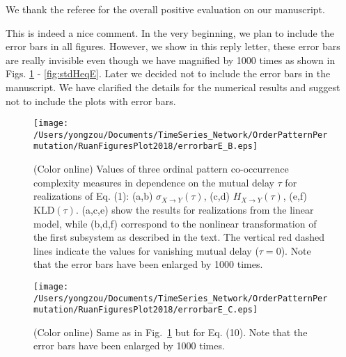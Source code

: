 \documentclass[aps,chaos,superscriptaddress,showkeys]{revtex4}
\begin{document}
\begin{center}
\begin{minipage}[c]{0.9\textwidth}
We thank the referee for the overall positive evaluation on our manuscript. 
\end{minipage}
\end{center}




\begin{center}
\begin{minipage}[c]{0.9\textwidth}
This is indeed a nice comment. In the very beginning, we plan to include the error bars in all figures. However, we show in this reply letter, these error bars are really invisible even though we have magnified by 1000 times as shown in Figs. \ref{fig:stdHeqB} - \ref{fig:stdHeqE}. Later we decided not to include the error bars in the manuscript. We have clarified the details for the numerical results and suggest not to include the plots with error bars.

\end{minipage}
\end{center}
\begin{figure}
	\centering
	\texttt{[image: /Users/yongzou/Documents/TimeSeries\_Network/OrderPatternPermutation/RuanFiguresPlot2018/errorbarE\_B.eps]}
\caption{(Color online) Values of three ordinal pattern co-occurrence complexity measures in dependence on the mutual delay $\tau$ for realizations of Eq. (1): (a,b) $\sigma_{X\to Y}(\tau)$, (c,d) $H_{X \to Y}(\tau)$, (e,f) $\text{KLD}(\tau)$. (a,c,e) show the results for realizations from the linear model, while (b,d,f) correspond to the nonlinear transformation of the first subsystem as described in the text. The vertical red dashed lines indicate the values for vanishing mutual delay ($\tau=0$). {\color{red}Note that the error bars have been enlarged by 1000 times.} \label{fig:stdHeqB}}
\end{figure}

\begin{figure}
	\centering
	\texttt{[image: /Users/yongzou/Documents/TimeSeries\_Network/OrderPatternPermutation/RuanFiguresPlot2018/errorbarE\_C.eps]}
\caption{(Color online) Same as in Fig.~\ref{fig:stdHeqB} but for Eq. (10). {\color{red}Note that the error bars have been enlarged by 1000 times.} \label{fig:stdHeqC}}
\end{figure}
\end{document}
